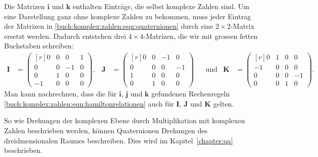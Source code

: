 Die Matrizen $\boldsymbol{i}$ und $\boldsymbol{k}$ enthalten
Einträge, die selbst komplexe Zahlen sind.
Um eine Darstellung ganz ohne komplexe Zahlen zu bekommen, muss
jeder Eintrag der Matrizen in \eqref{buch:komplex:zahlen:eqn:quaternionen}
durch eine $2\times 2$-Matrix ersetzt werden.
Dadurch entstehen drei $4\times 4$-Matrizen, die wir mit grossen
fetten Buchstaben schreiben:
\begin{align*}
\boldsymbol{I}
&=
\begin{pmatrix*}[r]
 0& 0& 0& 1\\
 0& 0&-1& 0\\
 0& 1& 0& 0\\
-1& 0& 0& 0
\end{pmatrix*},
&
\boldsymbol{J}
&=
\begin{pmatrix*}[r]
 0& 0&-1& 0\\
 0& 0& 0&-1\\
 1& 0& 0& 0\\
 0& 1& 0& 0
\end{pmatrix*}
&&\text{und}
&
\boldsymbol{K}
&=
\begin{pmatrix*}[r]
 0& 1& 0& 0\\
-1& 0& 0& 0\\
 0& 0& 0&-1\\
 0& 0& 1& 0
\end{pmatrix*}.
\end{align*}
Man kann nachrechnen, dass die für
$\boldsymbol{i}$,
$\boldsymbol{j}$
und
$\boldsymbol{k}$
gefundenen Rechenregeln
\eqref{buch:komplex:zahlen:eqn:hamiltonrelationen}
auch für
$\boldsymbol{I}$,
$\boldsymbol{J}$
und
$\boldsymbol{K}$
gelten.

So wie Drehungen der komplexen Ebene durch Multiplikation mit
komplexen Zahlen beschrieben werden, können Quaternionen Drehungen
des dreidmensionalen Raumes beschreiben.
Dies wird im Kapitel~\ref{chapter:qa} beschrieben.


